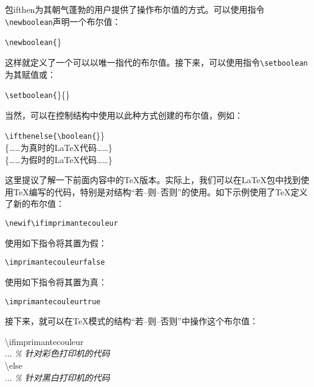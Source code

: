 包\textsf{ifthen}为其朝气蓬勃的用户提供了操作布尔值的方式。可以使用指令\verb+\newboolean+声明一个布尔值：

\begin{dmd}
\verb+\newboolean{+\}
\end{dmd}

这样就定义了一个可以以唯一指代的布尔值。接下来，可以使用指令\verb+\setboolean+为其赋值或：

\begin{dmd}
\verb|\setboolean{|\}\{\}
\end{dmd}

当然，可以在控制结构中使用以此种方式创建的布尔值，例如：

\begin{dmd}
\verb|\ifthenelse{\boolean{|\}\}\\
\{……为真时的\LaTeX 代码……\}\\
\{……为假时的\LaTeX 代码……\}
\end{dmd}

这里提议了解一下前面内容中的\TeX 版本。实际上，我们可以在\LaTeX 包中找到使用\TeX 编写的代码，特别是对结构“若--则--否则”的使用。如下示例使用了\TeX 定义了新的布尔值：

\begin{dmd}
\verb|\newif\ifimprimantecouleur|
\end{dmd}

使用如下指令将其置为假：

\begin{dmd}
\verb|\imprimantecouleurfalse|
\end{dmd}

使用如下指令将其置为真：

\begin{dmd}
\verb|\imprimantecouleurtrue|
\end{dmd}

接下来，就可以在\TeX 模式的结构“若--则--否则”中操作这个布尔值：

\begin{dmd}
\backslash ifimprimantecouleur\\
... \textsl{\% 针对彩色打印机的代码}\\
\backslash else\\
... \textsl{\% 针对黑白打印机的代码}
\end{dmd}

